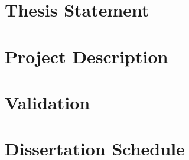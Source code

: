 \documentclass[phd]{byuprop}
\begin{document}
\section{Thesis Statement}

\section{Project Description}

\section{Validation}

\section{Dissertation Schedule}




\end{document}
